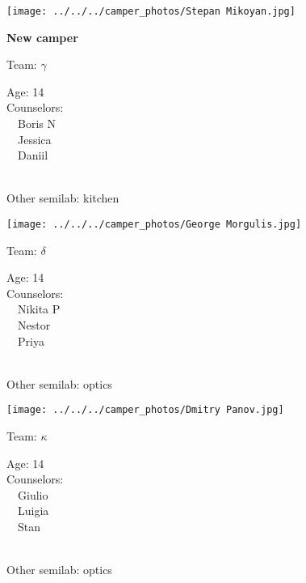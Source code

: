 \documentclass[10pt,letterpaper, landscape]{article}
\begin{document}
\horizontalshiftfornextsticker
\renewcommand{\baselinestretch}{1} \begin{sticker}
\noindent\begin{minipage}{0.5\textwidth}\texttt{[image: ../../../camper\_photos/Stepan Mikoyan.jpg]}\end{minipage}\begin{minipage}{0.45\textwidth}
\textbf{New camper} 

Team: {\Large $\gamma$}

Age:        14\\
Counselors: \\\ \ Boris N\\\ \ Jessica\\\ \ Daniil\\
\end{minipage} \\ \vspace{0.07in}
Other semilab: kitchen
\end{sticker}
\horizontalshiftfornextsticker
\renewcommand{\baselinestretch}{1} \begin{sticker}
\noindent\begin{minipage}{0.5\textwidth}\texttt{[image: ../../../camper\_photos/George Morgulis.jpg]}\end{minipage}\begin{minipage}{0.45\textwidth}
Team: {\Large $\delta$}

Age:        14\\
Counselors: \\\ \ Nikita P\\\ \ Nestor\\\ \ Priya\\
\end{minipage} \\ \vspace{0.07in}
Other semilab: optics
\end{sticker}
\verticalshiftfornextsticker
\renewcommand{\baselinestretch}{1} \begin{sticker}
\noindent\begin{minipage}{0.5\textwidth}\texttt{[image: ../../../camper\_photos/Dmitry Panov.jpg]}\end{minipage}\begin{minipage}{0.45\textwidth}
Team: {\Large $\kappa$}

Age:        14\\
Counselors: \\\ \ Giulio\\\ \ Luigia\\\ \ Stan\\
\end{minipage} \\ \vspace{0.07in}
Other semilab: optics
\end{sticker}
\end{document}
